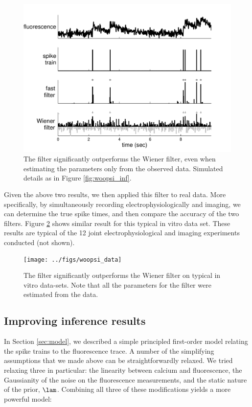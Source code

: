 \begin{figure}[h!]
\centering \includegraphics[width=.9\linewidth]{../figs/woopsi_learn}
\caption{The \foopsi filter significantly outperforms the Wiener filter, even when estimating the parameters only from the observed data.  Simulated details as in Figure \ref{fig:woopsi_inf}.} \label{fig:woopsi_learn}
\end{figure}

Given the above two results, we then applied this \foopsi filter to real data.  More specifically, by simultaneously recording electrophysiologically and imaging, we can determine the true spike times, and then compare the accuracy of the two filters.  Figure \ref{fig:woopsi_data} shows similar result for this typical in vitro data set.  These results are typical of the 12 joint electrophysiological and imaging experiments conducted (not shown).

\begin{figure}[h!]
\centering \texttt{[image: ../figs/woopsi\_data]}
\caption{The \foopsi filter significantly outperforms the Wiener filter on typical in vitro data-sets.  Note that all the parameters for the \foopsi filter were estimated from the data.} \label{fig:woopsi_data}
\end{figure}

\subsection{Improving inference results}

In Section \ref{sec:model}, we described a simple principled first-order model relating the spike trains to the fluorescence trace.  A number of the simplifying assumptions that we made above can be straightforwardly relaxed.  We tried relaxing three in particular: the linearity between calcium and fluorescence, the Gaussianity of the noise on the fluorescence measurements, and the static nature of the prior, $\lam$.  Combining all three of these modifications yields a more powerful model:


